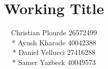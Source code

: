 \documentclass{article}
\begin{document}
\title{Working Title}
\author{Christian Plourde 26572499\\*
		Ayush Kharade 40042388\\*
		Daniel Vellucci 27416288\\*
		Samer Yazbeck 40049573
		}

\maketitle
\end{document}
